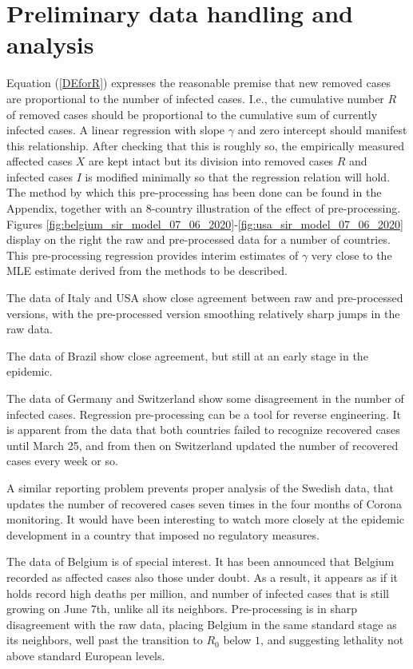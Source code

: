 \documentclass{article}
\begin{document}
\section{Preliminary data handling and analysis} \label{preliminarysection}

Equation (\ref{DEforR}) expresses the reasonable premise that new removed cases are proportional to the number of infected cases. I.e., the cumulative number $R$ of removed cases should be proportional to the cumulative sum of currently infected cases. A linear regression with slope $\gamma$ and zero intercept should manifest this relationship. After checking that this is roughly so, the empirically measured affected cases $X$ are kept intact but its division into removed cases $R$ and infected cases $I$ is modified minimally so that the regression relation will hold. The method by which this pre-processing has been done can be found in the Appendix, together with an 8-country illustration of the effect of pre-processing. Figures
\ref{fig:belgium_sir_model_07_06_2020}-\ref{fig:usa_sir_model_07_06_2020} display on the right the raw and pre-processed data for a number of countries. This pre-processing regression provides interim estimates of $\gamma$ very close to the MLE estimate derived from the methods to be described.

The data of Italy and USA show close agreement between raw and pre-processed versions, with the pre-processed version smoothing relatively sharp jumps in the raw data.

The data of Brazil show close agreement, but still at an early stage in the epidemic.

The data of Germany and Switzerland show some disagreement in the number of infected cases. Regression pre-processing can be a tool for reverse engineering. It is apparent from the data that both countries failed to recognize recovered cases until March 25, and from then on Switzerland updated the number of recovered cases every week or so.

A similar reporting problem prevents proper analysis of the Swedish data, that updates the number of recovered cases seven times in the four months of Corona monitoring. It would have been interesting to watch more closely at the epidemic development in a country that imposed no regulatory measures.

The data of Belgium is of special interest. It has been announced that Belgium recorded as affected cases also those under doubt. As a result, it appears as if it holds record high deaths per million, and number of infected cases that is still growing on June 7th, unlike all its neighbors. Pre-processing is in sharp disagreement with the raw data, placing Belgium in the same standard stage as its neighbors, well past the transition to $R_0$ below $1$, and suggesting lethality not above standard European levels.
\end{document}
